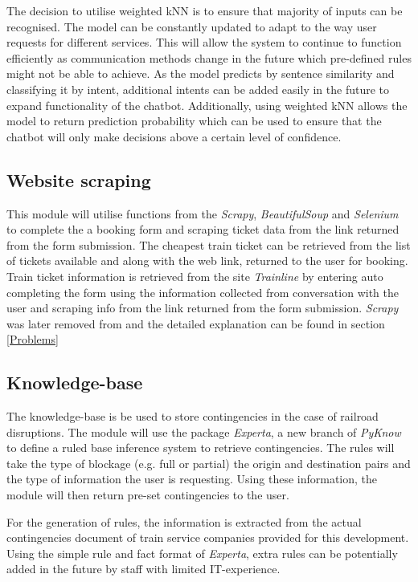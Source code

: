 \documentclass[11pt]{article}
\begin{document}
The decision to utilise weighted kNN is to ensure that majority of inputs can be recognised. The model can be constantly updated to adapt to the way user requests for different services. This will allow the system to continue to function efficiently as communication methods change in the future which pre-defined rules might not be able to achieve. As the model predicts by sentence similarity and classifying it by intent, additional intents can be added easily in the future to expand functionality of the chatbot. Additionally, using weighted kNN allows the model to return prediction probability which can be used to ensure that the chatbot will only make decisions above a certain level of confidence.

\subsection{Website scraping}
This module will utilise functions from the \textit{Scrapy}, \textit{BeautifulSoup} and \textit{Selenium} to complete the a booking form and scraping ticket data from the link returned from the form submission. The cheapest train ticket can be retrieved from the list of tickets available and along with the web link, returned to the user for booking. Train ticket information is retrieved from the site \textit{Trainline} by entering auto completing the form using the information collected from conversation with the user and scraping info from the link returned from the form submission. \textit{Scrapy} was later removed from and the detailed explanation can be found in section \ref{Problems}

\subsection{Knowledge-base}
The knowledge-base is be used to store contingencies in the case of railroad disruptions. The module will use the package \textit{Experta}, a new branch of \textit{PyKnow} to define a ruled base inference system to retrieve contingencies. The rules will take the type of blockage (e.g. full or partial) the origin and destination pairs and the type of information the user is requesting. Using these information, the module will then return pre-set contingencies to the user.

For the generation of rules, the information is extracted from the actual contingencies document of train service companies provided for this development. Using the simple rule and fact format of \textit{Experta}, extra rules can be potentially added in the future by staff with limited IT-experience.
\end{document}
